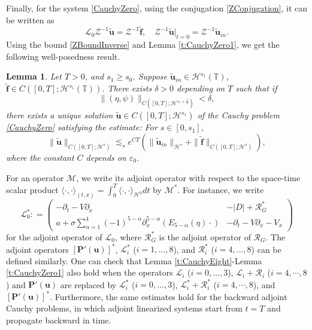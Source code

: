 \documentclass[12pt]{amsart}
\newtheorem{lemma}[theorem]{Lemma}
\theoremstyle{remark}
\theoremstyle{definition}
\numberwithin{equation}{section}
\newcommand{\p}{\partial}
\renewcommand{\H}{{\mathcal H }}
\newcommand{\al}{\alpha}
\newcommand{\f}{\frac}
\newcommand{\T}{{\mathbb T}}
\newcommand{\mR}{\mathcal{R}}
\newcommand{\mM}{\mathcal{M}}
\begin{document}
Finally, for the system \eqref{CauchyZero}, using the conjugation \eqref{ZConjugation}, it can be written as
\begin{equation*}
\mathcal{L}_0\mathcal{Z}^{-1}\tilde{\mathbf{u}}=\mathcal{Z}^{-1}\tilde{\mathbf{f}},\quad \mathcal{Z}^{-1}\tilde{\mathbf{u}}|_{t=0} = \mathcal{Z}^{-1}\tilde{\mathbf{u}}_{in}.
\end{equation*}
Using the bound \eqref{ZBoundInverse} and Lemma \ref{t:CauchyZero1}, we get the following well-posedness result.
\begin{lemma} \label{t:CauchyZero}
Let $T>0$, and $s_1\geq s_0$.
Suppose $\tilde{\mathbf{u}}_{in} \in \H^{s_1}(\T)$, $\tilde{\mathbf{f}}\in C([0,T]; \H^{s_1}(\T))$.
There exists $\delta>0$ depending on $T$ such that if 
\begin{equation*}
 \|(\eta, \psi)\|_{C([0,T]; \H^{s_1+\f52})}<\delta,
\end{equation*}
there exists a unique solution $\tilde{\mathbf{u}}\in C([0,T]; \H^{s_1})$ of the Cauchy problem \eqref{CauchyZero} satisfying the estimate:
For $s\in [0, s_1]$, 
\begin{equation} \label{TildeU0EnergyEst}
 \|\tilde{\mathbf{u}}\|_{C([0,T]; \H^s)} \lesssim_s e^{CT}\left(\|\tilde{\mathbf{u}}_{in} \|_{\H^s} + \|\tilde{\mathbf{f}}\|_{C([0,T]; \H^s)}\right),  
\end{equation}
where the constant $C$ depends on $\varepsilon_0$.
\end{lemma}

For an operator $\mM$, we write its adjoint operator with respect to the space-time scalar product $\langle \cdot, \cdot\rangle_{(t,x)} = \int_0^T \langle \cdot, \cdot\rangle_{\H^0}dt$ by  $\mM^*$.
For instance, we write
\begin{equation*}
 \mathcal{L}^*_0 : = \begin{pmatrix}
   -\p_t -V\p_x  &   -|D|+ \mathcal{R}^*_G \\
   a + \sigma \sum _{\al = 1}^4 (-1)^{5-\al}\p_x^{5-\al}\left(E_{5-\al}(\eta) \cdot\right)&  -\p_t - V\p_x - V_x 
    \end{pmatrix}
\end{equation*}
 for the adjoint operator of  $\mathcal{L}_0$, where $\mathcal{R}_G^*$ is the adjoint operator of $\mathcal{R}_G$. 
The adjoint operators $[\mathbf{P}'(\mathbf{u})]^*$, $\mathcal{L}_i^*$ ($i=1,\dots,8$), and $\mR_i^*$ ($i= 4, \dots, 8$) can be defined similarly.
One can check that Lemma \ref{t:CauchyEight}-Lemma \ref{t:CauchyZero1} also hold when the operators $\mathcal{L}_i$ ($i=0,\dots,3$), $\mathcal{L}_i + \mR_i$ ($i = 4, \cdots, 8$) and $\mathbf{P}'(\mathbf{u})$ are replaced by $\mathcal{L}_i^*$ ($i=0,\dots,3$), $\mathcal{L}_i^* + \mR_i^*$ ($i = 4,\cdots, 8$), and $[\mathbf{P}'(\mathbf{u})]^*$.
Furthermore, the same estimates hold for the backward adjoint Cauchy problems, in which adjoint linearized systems start from $t=T$ and propagate backward in time.
\end{document}

